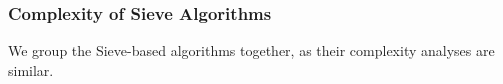 \subsubsection{Complexity of Sieve Algorithms}
\label{paragraph:methods:sieve-complexity}

We group the Sieve-based algorithms together, as their complexity analyses are similar.







